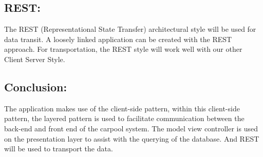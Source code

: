 \documentclass[hidelinks, 12pt, a4paper]{article}
\begin{document}
\subsection{\textbf{REST:}}
\newline
The REST (Representational State Transfer) architectural style will be used for data transit. A loosely linked application can be created with the REST approach. For transportation, the REST style will work well with our other Client Server Style.

\subsection{\textbf{Conclusion:}}
The application makes use of the client-side pattern, within this client-side pattern, the layered pattern is used to facilitate communication between the back-end and front end of the carpool system. The model view controller is used on the presentation layer to assist with the querying of the database. And REST will be used to transport the data.
\newpage
\end{document}
